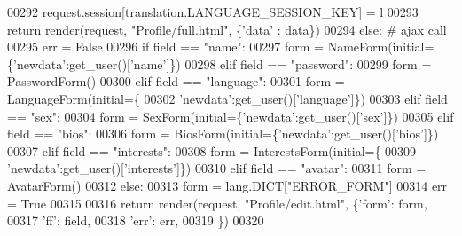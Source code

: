 \begin{DoxyCode}
00292                 request.session[translation.LANGUAGE\_SESSION\_KEY] = l
00293                 \textcolor{keywordflow}{return} render(request, \textcolor{stringliteral}{"Profile/full.html"}, \{\textcolor{stringliteral}{'data'} : data\})
00294             \textcolor{keywordflow}{else}: \textcolor{comment}{# ajax call}
00295                 err = \textcolor{keyword}{False}
00296                 \textcolor{keywordflow}{if}   field == \textcolor{stringliteral}{"name"}:
00297                     form = NameForm(initial=\{\textcolor{stringliteral}{'newdata'}:get\_user()[\textcolor{stringliteral}{'name'}]\})
00298                 \textcolor{keywordflow}{elif} field == \textcolor{stringliteral}{"password"}:
00299                     form = PasswordForm()
00300                 \textcolor{keywordflow}{elif} field == \textcolor{stringliteral}{"language"}:
00301                     form = LanguageForm(initial=\{
00302                             \textcolor{stringliteral}{'newdata'}:get\_user()[\textcolor{stringliteral}{'language'}]\})
00303                 \textcolor{keywordflow}{elif} field == \textcolor{stringliteral}{"sex"}:
00304                     form = SexForm(initial=\{\textcolor{stringliteral}{'newdata'}:get\_user()[\textcolor{stringliteral}{'sex'}]\})
00305                 \textcolor{keywordflow}{elif} field == \textcolor{stringliteral}{"bios"}:
00306                     form = BiosForm(initial=\{\textcolor{stringliteral}{'newdata'}:get\_user()[\textcolor{stringliteral}{'bios'}]\})
00307                 \textcolor{keywordflow}{elif} field == \textcolor{stringliteral}{"interests"}:
00308                     form = InterestsForm(initial=\{
00309                             \textcolor{stringliteral}{'newdata'}:get\_user()[\textcolor{stringliteral}{'interests'}]\})
00310                 \textcolor{keywordflow}{elif} field == \textcolor{stringliteral}{"avatar"}:
00311                     form = AvatarForm()
00312                 \textcolor{keywordflow}{else}:
00313                     form = lang.DICT[\textcolor{stringliteral}{"ERROR\_FORM"}]
00314                     err = \textcolor{keyword}{True} 
00315 
00316                 \textcolor{keywordflow}{return} render(request, \textcolor{stringliteral}{"Profile/edit.html"}, \{\textcolor{stringliteral}{'form'}: form,
00317                                                              \textcolor{stringliteral}{'ff'}: field,
00318                                                              \textcolor{stringliteral}{'err'}: err,
00319                                                             \})
00320         

\end{DoxyCode}


